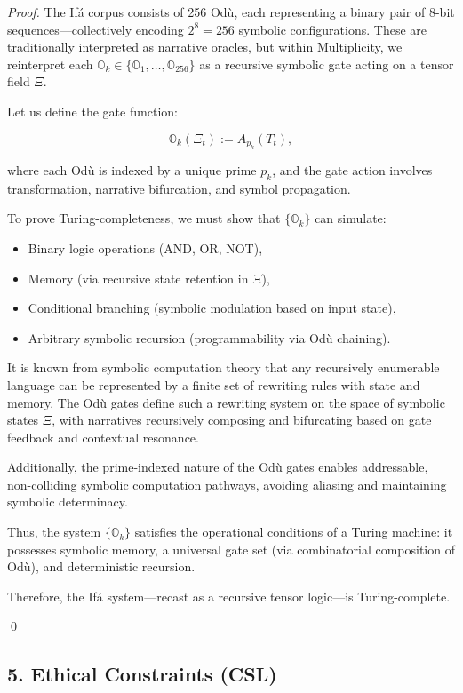 \documentclass{article}
\theoremstyle{plain}
\begin{document}
\begin{proof}
The Ifá corpus consists of 256 Odù, each representing a binary pair of 8-bit sequences—collectively encoding \( 2^8 = 256 \) symbolic configurations. These are traditionally interpreted as narrative oracles, but within Multiplicity, we reinterpret each \( \mathbb{O}_k \in \{ \mathbb{O}_1, \ldots, \mathbb{O}_{256} \} \) as a recursive symbolic gate acting on a tensor field \( \Xi \).

Let us define the gate function:

\[
\mathbb{O}_k(\Xi_t) := A_{p_k}(T_t),
\]

where each Odù is indexed by a unique prime \( p_k \), and the gate action involves transformation, narrative bifurcation, and symbol propagation.

To prove Turing-completeness, we must show that \( \{ \mathbb{O}_k \} \) can simulate:
\begin{itemize}
    \item Binary logic operations (AND, OR, NOT),
    \item Memory (via recursive state retention in \( \Xi \)),
    \item Conditional branching (symbolic modulation based on input state),
    \item Arbitrary symbolic recursion (programmability via Odù chaining).
\end{itemize}

It is known from symbolic computation theory that any recursively enumerable language can be represented by a finite set of rewriting rules with state and memory. The Odù gates define such a rewriting system on the space of symbolic states \( \Xi \), with narratives recursively composing and bifurcating based on gate feedback and contextual resonance.

Additionally, the prime-indexed nature of the Odù gates enables addressable, non-colliding symbolic computation pathways, avoiding aliasing and maintaining symbolic determinacy.

Thus, the system \( \{ \mathbb{O}_k \} \) satisfies the operational conditions of a Turing machine: it possesses symbolic memory, a universal gate set (via combinatorial composition of Odù), and deterministic recursion.

Therefore, the Ifá system—recast as a recursive tensor logic—is Turing-complete.

\qed
\end{proof}
\subsection{5. Ethical Constraints (CSL)}
\end{document}

